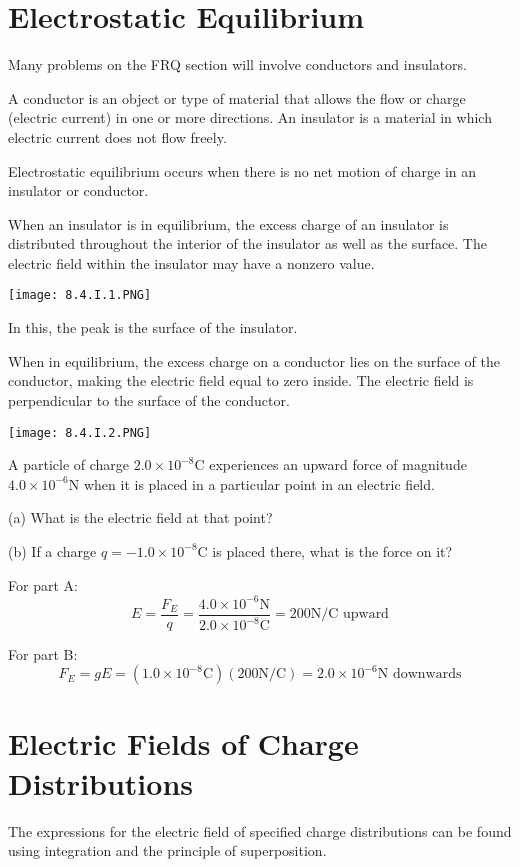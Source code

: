 \documentclass[../em.tex]{subfiles}
\begin{document}
\section{Electrostatic Equilibrium}
Many problems on the FRQ section will involve conductors and insulators. 

A conductor is an object or type of material that allows the flow or charge 
(electric current) in one or more directions. An insulator is a material in which electric current does not flow freely.

Electrostatic equilibrium occurs when there is no net motion of charge in an insulator or conductor.

When an insulator is in equilibrium, the excess charge of an insulator is 
distributed throughout the interior of the insulator as well as the surface. 
The electric field within the insulator may have a nonzero value. 
\begin{center}
    \texttt{[image: 8.4.I.1.PNG]}
\end{center}

In this, the peak is the surface of the insulator. 

When in equilibrium, the excess charge on a conductor lies on the surface of the conductor, 
making the electric field equal to zero inside. The electric field is perpendicular to the surface of the conductor.
\begin{center}
    \texttt{[image: 8.4.I.2.PNG]}
\end{center}

\begin{example}
    A particle of charge $2.0\times10^{-8}$C experiences an upward force of magnitude $4.0\times10^{-6}$N 
    when it is placed in a particular point in an electric field. 
    
    (a) What is the electric field at that point? 
    
    (b) If a charge $q=-1.0\times10^{-8}$C is placed there, what is the force on it?

    For part A:
    \[E=\frac{F_E}{q}=\frac{4.0\times10^{-6}\text{N}}{2.0\times10^{-8}\text{C}}=200\text{N/C upward}\]

    For part B:
    \[F_E=gE=(1.0\times10^{-8}\text{C})(200\text{N/C})=2.0\times10^{-6}\text{N downwards}\]
\end{example}


\section{Electric Fields of Charge Distributions}
The expressions for the electric field of specified charge distributions can be found using integration and the principle of superposition. 
\end{document}
